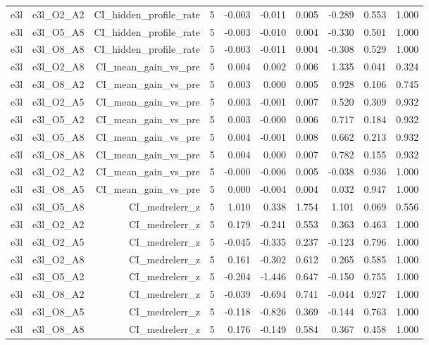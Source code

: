 \documentclass[11pt]{article}
\begin{document}
\begin{landscape}
\begin{longtable}{@{}lrrrrrrrrr@{}}
e3l & e3l\_O2\_A2 & CI\_hidden\_profile\_rate & 5 & -0.003 & -0.011 & 0.005 & -0.289 & 0.553 & 1.000 \\
e3l & e3l\_O5\_A8 & CI\_hidden\_profile\_rate & 5 & -0.003 & -0.010 & 0.004 & -0.330 & 0.501 & 1.000 \\
e3l & e3l\_O8\_A8 & CI\_hidden\_profile\_rate & 5 & -0.003 & -0.011 & 0.004 & -0.308 & 0.529 & 1.000 \\
e3l & e3l\_O2\_A8 & CI\_mean\_gain\_vs\_pre & 5 & 0.004 & 0.002 & 0.006 & 1.335 & 0.041 & 0.324 \\
e3l & e3l\_O8\_A2 & CI\_mean\_gain\_vs\_pre & 5 & 0.003 & 0.000 & 0.005 & 0.928 & 0.106 & 0.745 \\
e3l & e3l\_O2\_A5 & CI\_mean\_gain\_vs\_pre & 5 & 0.003 & -0.001 & 0.007 & 0.520 & 0.309 & 0.932 \\
e3l & e3l\_O5\_A2 & CI\_mean\_gain\_vs\_pre & 5 & 0.003 & -0.000 & 0.006 & 0.717 & 0.184 & 0.932 \\
e3l & e3l\_O5\_A8 & CI\_mean\_gain\_vs\_pre & 5 & 0.004 & -0.001 & 0.008 & 0.662 & 0.213 & 0.932 \\
e3l & e3l\_O8\_A8 & CI\_mean\_gain\_vs\_pre & 5 & 0.004 & 0.000 & 0.007 & 0.782 & 0.155 & 0.932 \\
e3l & e3l\_O2\_A2 & CI\_mean\_gain\_vs\_pre & 5 & -0.000 & -0.006 & 0.005 & -0.038 & 0.936 & 1.000 \\
e3l & e3l\_O8\_A5 & CI\_mean\_gain\_vs\_pre & 5 & 0.000 & -0.004 & 0.004 & 0.032 & 0.947 & 1.000 \\
e3l & e3l\_O5\_A8 & CI\_medrelerr\_z & 5 & 1.010 & 0.338 & 1.754 & 1.101 & 0.069 & 0.556 \\
e3l & e3l\_O2\_A2 & CI\_medrelerr\_z & 5 & 0.179 & -0.241 & 0.553 & 0.363 & 0.463 & 1.000 \\
e3l & e3l\_O2\_A5 & CI\_medrelerr\_z & 5 & -0.045 & -0.335 & 0.237 & -0.123 & 0.796 & 1.000 \\
e3l & e3l\_O2\_A8 & CI\_medrelerr\_z & 5 & 0.161 & -0.302 & 0.612 & 0.265 & 0.585 & 1.000 \\
e3l & e3l\_O5\_A2 & CI\_medrelerr\_z & 5 & -0.204 & -1.446 & 0.647 & -0.150 & 0.755 & 1.000 \\
e3l & e3l\_O8\_A2 & CI\_medrelerr\_z & 5 & -0.039 & -0.694 & 0.741 & -0.044 & 0.927 & 1.000 \\
e3l & e3l\_O8\_A5 & CI\_medrelerr\_z & 5 & -0.118 & -0.826 & 0.369 & -0.144 & 0.763 & 1.000 \\
e3l & e3l\_O8\_A8 & CI\_medrelerr\_z & 5 & 0.176 & -0.149 & 0.584 & 0.367 & 0.458 & 1.000 \\

\end{longtable}
\end{landscape}
\end{document}
